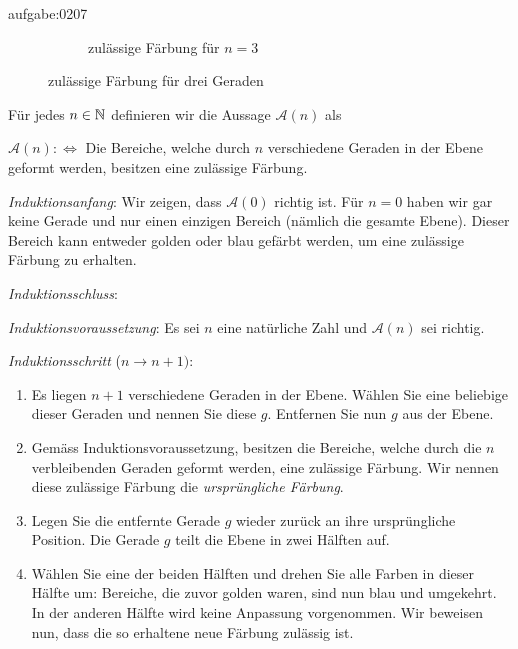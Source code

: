 \begin{antwort}{aufgabe:0207}
\begin{figure}[H]
\begin{subfigure}[b]{0.45\textwidth}
        \caption{zulässige Färbung für $n=3$}
        \label{subfig:3linesFilled}
    \end{subfigure}
    \caption{zulässige Färbung für drei Geraden}
    \label{fig:3lines}
\end{figure}
\noindent
Für jedes $n\in\mathbb{N}$ definieren wir die Aussage $\mathcal{A}(n)$ als
\begin{center}
    $\mathcal{A}(n) :\iff $ Die Bereiche, welche durch $n$ verschiedene Geraden in der Ebene geformt werden, besitzen eine zulässige Färbung.
\end{center}
\begin{aenum}
    \item \textit{Induktionsanfang}: Wir zeigen, dass $\mathcal{A}(0)$ richtig ist. Für $n=0$ haben wir gar keine Gerade und nur einen einzigen Bereich (nämlich die gesamte Ebene). Dieser Bereich kann entweder golden oder blau gefärbt werden, um eine zulässige Färbung zu erhalten.
    \item \textit{Induktionsschluss}:
        \begin{renum}
            \item \textit{Induktionsvoraussetzung}: Es sei $n$ eine natürliche Zahl und $\mathcal{A}(n)$ sei richtig.
            \item \textit{Induktionsschritt} ($n\to n+1)$:
            \begin{enumerate}
                \item Es liegen $n+1$ verschiedene Geraden in der Ebene. Wählen Sie eine beliebige dieser Geraden und nennen Sie diese $g$. Entfernen Sie nun $g$ aus der Ebene.
                \item Gemäss Induktionsvoraussetzung, besitzen die Bereiche, welche durch die $n$ verbleibenden Geraden geformt werden, eine zulässige Färbung. Wir nennen diese zulässige Färbung die \textit{ursprüngliche Färbung}.
                \item Legen Sie die entfernte Gerade $g$ wieder zurück an ihre ursprüngliche Position. Die Gerade $g$ teilt die Ebene in zwei Hälften auf.
                \item Wählen Sie eine der beiden Hälften und drehen Sie alle Farben in dieser Hälfte um: Bereiche, die zuvor golden waren, sind nun blau und umgekehrt. In der anderen Hälfte wird keine Anpassung vorgenommen. Wir beweisen nun, dass die so erhaltene neue Färbung zulässig ist.

\end{enumerate}
\end{renum}
\end{aenum}
\end{antwort}
